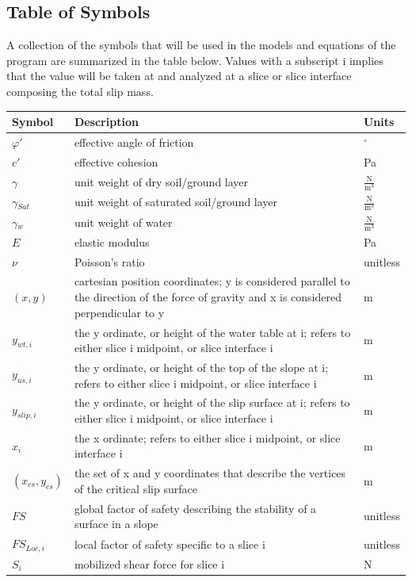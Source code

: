\documentclass[12pt]{article}
\begin{document}
\subsection{Table of Symbols}
\label{Sec:ToS}
A collection of the symbols that will be used in the models and equations of the program are summarized in the table below. Values with a subscript i implies that the value will be taken at and analyzed at a slice or slice interface composing the total slip mass.
\begin{longtable*}{l l l}
\toprule
Symbol & Description & Units
\\
\midrule
$\varphi{}'$ & effective angle of friction & ${}^{\circ}$
\\
$c'$ & effective cohesion & Pa
\\
$\gamma{}$ & unit weight of dry soil/ground layer & $\frac{\text{N}}{\text{m}^{3}}$
\\
$\gamma{}_{Sat}$ & unit weight of saturated soil/ground layer & $\frac{\text{N}}{\text{m}^{3}}$
\\
$\gamma{}_{w}$ & unit weight of water & $\frac{\text{N}}{\text{m}^{3}}$
\\
$E$ & elastic modulus & Pa
\\
$\nu{}$ & Poisson's ratio & unitless
\\
$(x,y)$ & cartesian position coordinates; y is considered parallel to the direction of the force of gravity and x is considered perpendicular to y & m
\\
$y_{wt,i}$ & the y ordinate, or height of the water table at i; refers to either slice i midpoint, or slice interface i & m
\\
$y_{us,i}$ & the y ordinate, or height of the top of the slope at i; refers to either slice i midpoint, or slice interface i & m
\\
$y_{slip,i}$ & the y ordinate, or height of the slip surface at i; refers to either slice i midpoint, or slice interface i & m
\\
$x_{i}$ & the x ordinate; refers to either slice i midpoint, or slice interface i & m
\\
$({x_{cs}},{y_{cs}})$ & the set of x and y coordinates that describe the vertices of the critical slip surface & m
\\
$FS$ & global factor of safety describing the stability of a surface in a slope & unitless
\\
$FS_{Loc,i}$ & local factor of safety specific to a slice i & unitless
\\
$S_{i}$ & mobilized shear force for slice i & N

\end{longtable*}
\end{document}
